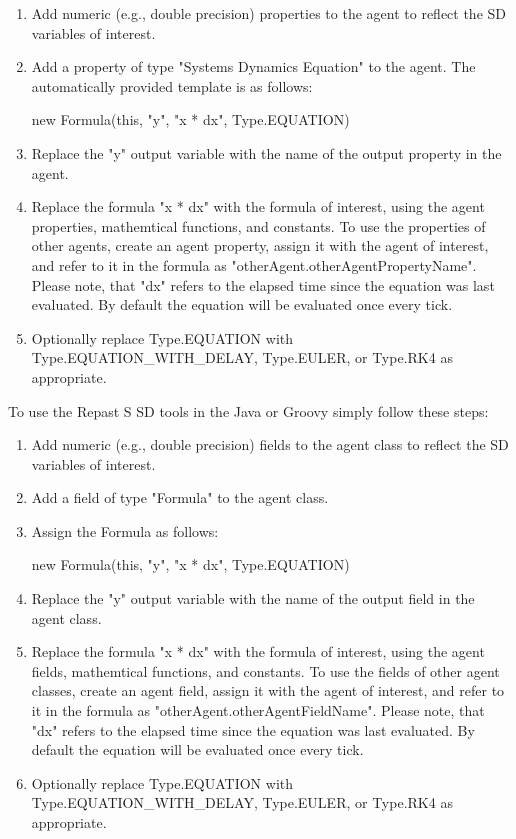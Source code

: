 \documentclass[11pt]{article}
\begin{document}
\begin{enumerate}
\item Add numeric (e.g., double precision) properties to the agent to reflect the SD variables of interest.
\item Add a property of type "Systems Dynamics Equation" to the agent. The automatically provided template is as follows:

new Formula(this, "y", "x * dx", Type.EQUATION)
\item Replace  the "y" output variable with the name of the output property in the agent.
\item Replace the formula "x * dx" with the formula of interest, using the agent properties, mathemtical functions, and constants. To use the properties of other agents, create an agent property, assign it with the agent of interest, and refer to it in the formula as "otherAgent.otherAgentPropertyName".  Please note, that "dx" refers to the elapsed time since the equation was last evaluated. By default the equation will be evaluated once every tick.
\item Optionally replace Type.EQUATION with Type.EQUATION\_WITH\_DELAY, Type.EULER, or Type.RK4 as appropriate.
\end{enumerate}

To use the Repast S SD tools in the Java or Groovy simply follow these steps:

\begin{enumerate}
\item Add numeric (e.g., double precision) fields to the agent class to reflect the SD variables of interest.
\item Add a field of type "Formula" to the agent class.
\item Assign the Formula as follows:

new Formula(this, "y", "x * dx", Type.EQUATION)

\item Replace  the "y" output variable with the name of the output field in the agent class.

\item Replace the formula "x * dx" with the formula of interest, using the agent fields, mathemtical functions, and constants. To use the fields of other agent classes, create an agent field, assign it with the agent of interest, and refer to it in the formula as "otherAgent.otherAgentFieldName".  Please note, that "dx" refers to the elapsed time since the equation was last evaluated. By default the equation will be evaluated once every tick.
\item Optionally replace Type.EQUATION with Type.EQUATION\_WITH\_DELAY, Type.EULER, or Type.RK4 as appropriate.
\end{enumerate}
\end{document}
